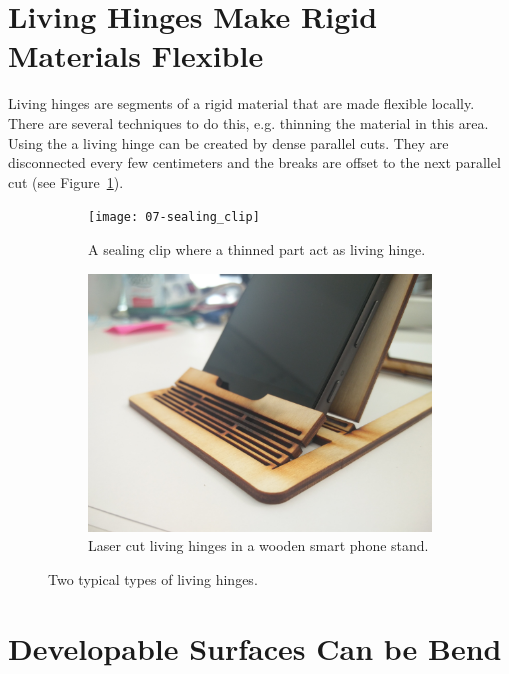 \documentclass[../ClassicThesis.tex]{subfiles}
\begin{document}
\section{Living Hinges Make Rigid Materials Flexible}
\label{sec:living_hinges}

Living hinges are segments of a rigid material that are made flexible locally. There are several techniques to do this, e.g. thinning the material in this area. Using the \lasercutter{} a living hinge can be created by dense parallel cuts. They are disconnected every few centimeters and the breaks are offset to the next parallel cut (see Figure~\ref{fig:living_hinge}).

\begin{figure}[h]
  \centering
  \begin{subfigure}[b]{0.49\textwidth}
    \centering
    \texttt{[image: 07-sealing\_clip]}
    \caption{A sealing clip where a thinned part act as living hinge.}
  \end{subfigure}
  \begin{subfigure}[b]{0.49\textwidth}
    \centering
    \includegraphics[width=1\textwidth]{07-living_hinge_wood}
    \caption{Laser cut living hinges in a wooden smart phone stand.}
  \end{subfigure}
  \caption{Two typical types of living hinges.}
  \label{fig:living_hinge}
\end{figure}

\section{Developable Surfaces Can be Bend}
\end{document}
